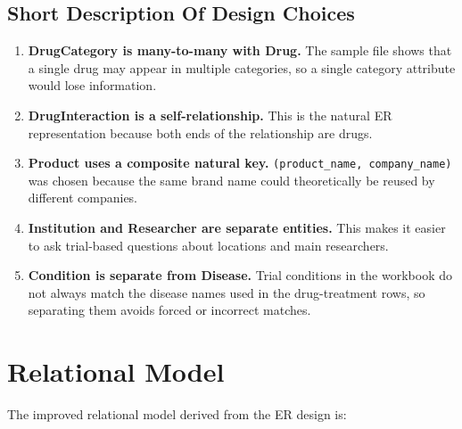 \documentclass[12pt,a4paper]{article}
\begin{document}
\subsection{Short Description Of Design Choices}
\begin{enumerate}[leftmargin=1.5em]
    \item \textbf{DrugCategory is many-to-many with Drug.} The sample file shows that a single drug may appear in multiple categories, so a single category attribute would lose information.
    \item \textbf{DrugInteraction is a self-relationship.} This is the natural ER representation because both ends of the relationship are drugs.
    \item \textbf{Product uses a composite natural key.} \texttt{(product\_name, company\_name)} was chosen because the same brand name could theoretically be reused by different companies.
    \item \textbf{Institution and Researcher are separate entities.} This makes it easier to ask trial-based questions about locations and main researchers.
    \item \textbf{Condition is separate from Disease.} Trial conditions in the workbook do not always match the disease names used in the drug-treatment rows, so separating them avoids forced or incorrect matches.
\end{enumerate}

\section{Relational Model}
The improved relational model derived from the ER design is:
\end{document}
